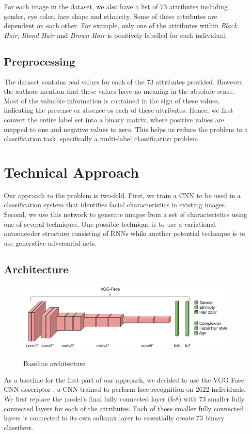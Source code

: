 \documentclass[twocolumn]{article}
\begin{document}
For each image in the dataset, we also have a list of 73 attributes including gender, eye color, face shape and ethnicity. Some of these attributes are dependent on each other. For example, only one of the attributes within \emph{Black Hair}, \emph{Blond Hair} and \emph{Brown Hair} is positively labelled for each individual. 

\subsection{Preprocessing}
The dataset contains real values for each of the 73 attributes provided. However, the authors mention that these values have no meaning in the absolute sense. Most of the valuable information is contained in the sign of these values, indicating the presense or absence os each of these attributes. Hence, we first convert the entire label set into a binary matrix, where positive values are mapped to one and negative values to zero. This helps us reduce the problem to a classification task, specifically a multi-label classification problem. 
\section{Technical Approach}
Our approach to the problem is two-fold. First, we train a CNN to be used in a classification system that identifies facial characteristics in existing images. Second, we use this network to generate images from a set of characteristics using one of several techniques. One possible technique is to use a variational autoencoder structure consisting of RNNs while another potential technique is to use generative adversarial nets. 


\subsection{Architecture}
\begin{figure}[h]
    \centering
    \includegraphics[width=\linewidth]{images/arch}
    \label{fig:arch}
    \caption{Baseline architecture}
\end{figure}
As a baseline for the first part of our approach, we decided to use the VGG Face CNN descriptor \cite{vggfacenet}, a CNN trained to perform face recognition on 2622 individuals. We first replace the model's final fully connected layer (fc8) with 73 smaller fully connected layers for each of the attributes. Each of these smaller fully connected layers is connected to its own softmax layer to essentially create 73 binary classifiers. 
\end{document}

